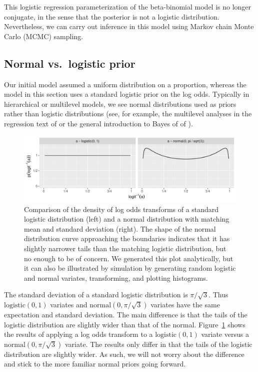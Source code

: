 \documentclass[11pt]{report}
\newcommand{\mycaption}[2]{\caption{#2}\label{#1}}
\begin{document}
This logistic regression parameterization of the beta-binomial model
is no longer conjugate, in the sense that the posterior is not a
logistic distribution.  Nevertheless, we can carry out inference in
this model using Markov chain Monte Carlo (MCMC) sampling.

\subsection{Normal vs.\ logistic prior}

Our initial model assumed a uniform distribution on a proportion,
whereas the model in this section uses a standard logistic prior on
the log odds.  Typically in hierarchical or multilevel models, we see
normal distributions used as priors rather than logistic
distributions (see, for example, the multilevel analyses in the
regression text of \cite{gelman2006data} or the general introduction
to Bayes of of \cite{lunn2013bugs}).

\begin{figure}[t]
  \centering
  \includegraphics[width=\textwidth]{../../img/ilogit-logistic-vs-normal.pdf}
  \mycaption{fig:logistic-vs-normal}{Comparison of the density of log
    odds transforms of a standard logistic distribution (left) and a
    normal distribution with matching mean and standard deviation
    (right).  The shape of the normal distribution curve approaching
    the boundaries indicates that it has slightly narrower tails than
    the matching logistic distribution, but no enough to be of
    concern.  We generated this plot analytically, but it can also be
    illustrated by simulation by generating random logistic and normal
    variates, transforming, and plotting histograms.}
\end{figure}
%
The standard deviation of a standard logistic distribution is $\pi /
\sqrt{3}$.  Thus $\textrm{logistic}(0, 1)$ variates and
$\textrm{normal}(0, \pi / \sqrt{3})$ variates have the same
expectation and standard deviation.  The main difference is that the
tails of the logistic distribution are slightly wider than that of the
normal.  Figure~\ref{fig:logistic-vs-normal} shows the results of
applying a log odds transform to a $\textrm{logistic}(0, 1)$ variate
versus a $\textrm{normal}(0, \pi / \sqrt{3})$ variate.  The results
only differ in that the tails of the logistic distribution are
slightly wider.  As such, we will not worry about the difference and
stick to the more familiar normal priors going forward.
\end{document}
